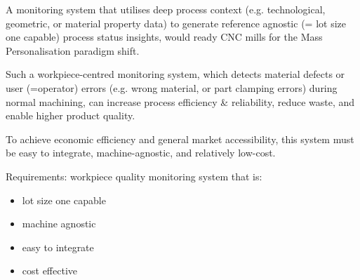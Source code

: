 \documentclass[5p,times,procedia]{elsarticle}
\newenvironment{note}{%
	\noindent
    \color{notecolor}%
}{%
    \par\medskip%
}
\begin{document}
\begin{nomenclature}
\begin{deflist}[AAA]%
\end{deflist}
\end{nomenclature}%


A monitoring system that utilises deep process context (e.g. technological, geometric, or material property data) to generate reference agnostic (= lot size one capable) process status insights, would ready CNC mills for the Mass Personalisation paradigm shift.

Such a workpiece-centred monitoring system, which detects material defects or user (=operator) errors (e.g. wrong material, or part clamping errors) during normal machining, can increase process efficiency \& reliability, reduce waste, and enable higher product quality.  

To achieve economic efficiency and general market accessibility, this system must be easy to integrate, machine-agnostic, and relatively low-cost.

\vspace*{.5\baselineskip}
\noindent Requirements: workpiece quality monitoring system that is: 
\vspace*{-\baselineskip}
\begin{itemize}
	\item lot size one capable
	\item machine agnostic
	\item easy to integrate
	\item cost effective
\end{itemize}
\end{document}
